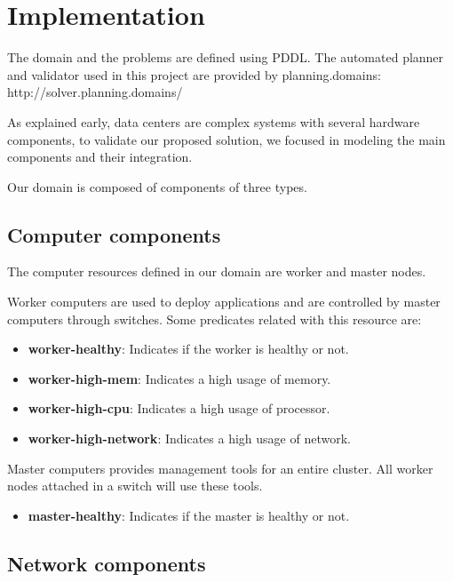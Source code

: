 \documentclass[letterpaper]{article}
\begin{document}
\section{Implementation}\label{sec:implementation}

The domain and the problems are defined using PDDL. The automated planner and validator used in this project are provided by planning.domains: http://solver.planning.domains/

As explained early, data centers are complex systems with several hardware components, to validate our proposed solution, we focused in modeling the main components and their integration.

Our domain is composed of components of three types.

\subsection{Computer components}\label{sec:implementation1}

The computer resources defined in our domain are worker and master nodes.

Worker computers are used to deploy applications and are controlled by master computers through switches. Some predicates related with this resource are:

\begin{itemize}
    \item \textbf{worker-healthy}: Indicates if the worker is healthy or not.
    \item \textbf{worker-high-mem}: Indicates a high usage of memory.
    \item \textbf{worker-high-cpu}: Indicates a high usage of processor.
    \item \textbf{worker-high-network}: Indicates a high usage of network.
\end{itemize}

Master computers provides management tools for an entire cluster. All worker nodes attached in a switch will use these tools. 

\begin{itemize}
    \item \textbf{master-healthy}: Indicates if the master is healthy or not.
\end{itemize}

\subsection{Network components}\label{sec:implementation2}
\end{document}
